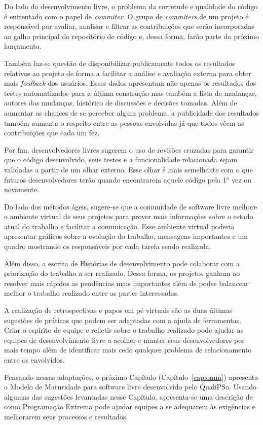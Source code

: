 Do lado do desenvolvimento livre, o problema da corretude e qualidade
do código é enfrentado com o papel de \emph{commiter}. O grupo de
\emph{commiters} de um projeto é responsável por avaliar, analisar e
filtrar as contribuições que serão incorporadas ao galho principal do
repositório de código e, dessa forma, farão parte do próximo
lançamento.

Também faz-se questão de disponibilizar publicamente todos os
resultados relativos ao projeto de forma a facilitar a análise e
avaliação externa para obter mais \textit{feedback} dos
usuários. Esses dados apresentam não apenas os resultados dos testes
automatizados para a última construção mas também a lista de mudanças,
autores das mudanças, histórico de discussões e decisões tomadas. Além
de aumentar as chances de se perceber algum problema, a publicidade
dos resultados também aumenta o respeito entre as pessoas envolvidas
já que todos vêem as contribuições que cada um fez.

Por fim, desenvolvedores livres sugerem o uso de revisões cruzadas
para garantir que o código desenvolvido, seus testes e a
funcionalidade relacionada sejam validadas a partir de um olhar
externo. Esse olhar é mais semelhante com o que futuros
desenvolvedores terão quando encontrarem aquele código pela
1$^\textrm{a}$ vez ou novamente.

Do lado dos métodos ágeis, sugere-se que a comunidade de software
livre melhore o ambiente virtual de seus projetos para prover mais
informações sobre o estado atual do trabalho e facilitar a
comunicação. Esse ambiente virtual poderia apresentar gráficos sobre a
evolução do trabalho, mensagens importantes e um quadro mostrando os
responsáveis por cada tarefa sendo realizada.

Além disso, a escrita de Histórias de desenvolvimento pode colaborar
com a priorização do trabalho a ser realizado. Dessa forma, os
projetos ganham ao resolver mais rápidos as pendências mais
importantes além de poder balancear melhor o trabalho realizado entre
as partes interessadas.

A realização de retrospectivas e papos em pé virtuais são as duas
últimas sugestões de práticas que podem ser adaptadas com a ajuda de
ferramentas. Criar o espírito de equipe e refletir sobre o trabalho
realizado pode ajudar as equipes de desenvolvimento livre a acolher e
manter seus desenvolvedores por mais tempo além de identificar mais
cedo qualquer problema de relacionamento entre os envolvidos.

Pensando nessas adaptações, o próximo Capítulo
(Capítulo~\ref{cap:omm}) apresenta o Modelo de Maturidade para
software livre desenvolvido pelo QualiPSo. Usando algumas das
sugestões levantadas nesse Capítulo, apresenta-se uma descrição de
como Programação Extrema pode ajudar equipes a se adequarem às
exigências e melhorarem seus processos e resultados.

